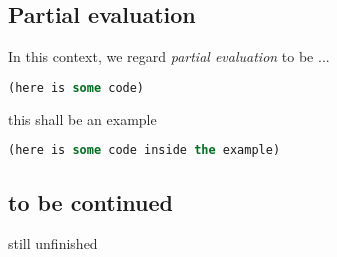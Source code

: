 \documentclass[main.tex]{subfiles}
\begin{document}
\subsection{Partial evaluation}

In this context, we regard \emph{partial evaluation} to be ...

\begin{lstwrap}\begin{lstlisting}[language=lisp]
(here is some code)
\end{lstlisting}\end{lstwrap}

\begin{mexample}
    this shall be an example
    \begin{lstwrap}\begin{lstlisting}[language=lisp]
    (here is some code inside the example)
    \end{lstlisting}\end{lstwrap}
\end{mexample}

\subsection{to be continued}
still unfinished \pika
\end{document}

